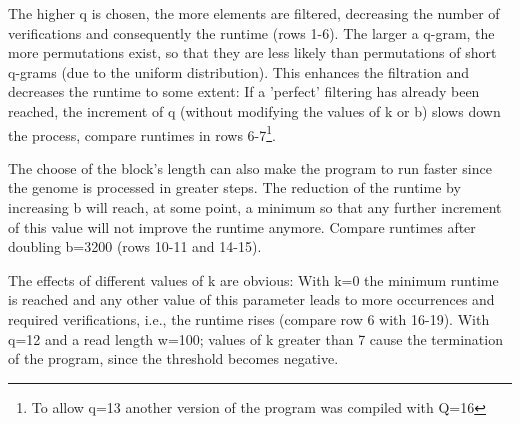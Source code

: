 \documentclass[11pt, notitlepage]{scrartcl}
\begin{document}
The higher q is chosen, the more elements are filtered, decreasing the number of verifications and consequently the
runtime (rows 1-6). The larger a q-gram, the more permutations exist, so that they are less likely than permutations of
short q-grams (due to the uniform distribution). This enhances the filtration and decreases the runtime to some extent:
If a 'perfect' filtering has already been reached, the increment of q (without modifying  the values of k or b) slows
down the process, compare runtimes in rows 6-7\footnote{To allow q=13 another version of the program was compiled with Q=16}.

The choose of the block's length can also make the program to run faster since the genome is processed in greater steps. The reduction of the runtime by increasing b will reach, at some point, a minimum so that any further increment of this value will not improve the runtime anymore. Compare runtimes after doubling b=3200 (rows 10-11 and 14-15).

The effects of different values of k are obvious: With k=0 the minimum runtime is reached and any other value of this
parameter leads to more occurrences and required verifications, i.e., the runtime rises (compare row 6 with 16-19). With q=12 and a read length w=100; values of k greater than 7 cause the termination of the program, since the threshold becomes negative.


\end{document}
